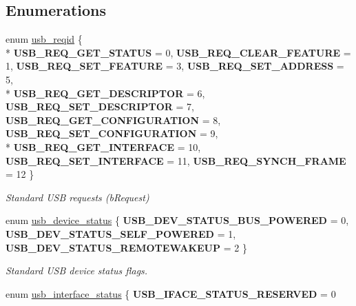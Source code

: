 \subsection*{Enumerations}
\begin{DoxyCompactItemize}
\item 
enum \hyperlink{group__usb__protocol__group_gab43332ff8dbad3dd3c8c882b1bd68a89}{usb\-\_\-reqid} \{ \\*
{\bfseries U\-S\-B\-\_\-\-R\-E\-Q\-\_\-\-G\-E\-T\-\_\-\-S\-T\-A\-T\-U\-S} =  0, 
{\bfseries U\-S\-B\-\_\-\-R\-E\-Q\-\_\-\-C\-L\-E\-A\-R\-\_\-\-F\-E\-A\-T\-U\-R\-E} =  1, 
{\bfseries U\-S\-B\-\_\-\-R\-E\-Q\-\_\-\-S\-E\-T\-\_\-\-F\-E\-A\-T\-U\-R\-E} =  3, 
{\bfseries U\-S\-B\-\_\-\-R\-E\-Q\-\_\-\-S\-E\-T\-\_\-\-A\-D\-D\-R\-E\-S\-S} =  5, 
\\*
{\bfseries U\-S\-B\-\_\-\-R\-E\-Q\-\_\-\-G\-E\-T\-\_\-\-D\-E\-S\-C\-R\-I\-P\-T\-O\-R} =  6, 
{\bfseries U\-S\-B\-\_\-\-R\-E\-Q\-\_\-\-S\-E\-T\-\_\-\-D\-E\-S\-C\-R\-I\-P\-T\-O\-R} =  7, 
{\bfseries U\-S\-B\-\_\-\-R\-E\-Q\-\_\-\-G\-E\-T\-\_\-\-C\-O\-N\-F\-I\-G\-U\-R\-A\-T\-I\-O\-N} =  8, 
{\bfseries U\-S\-B\-\_\-\-R\-E\-Q\-\_\-\-S\-E\-T\-\_\-\-C\-O\-N\-F\-I\-G\-U\-R\-A\-T\-I\-O\-N} =  9, 
\\*
{\bfseries U\-S\-B\-\_\-\-R\-E\-Q\-\_\-\-G\-E\-T\-\_\-\-I\-N\-T\-E\-R\-F\-A\-C\-E} =  10, 
{\bfseries U\-S\-B\-\_\-\-R\-E\-Q\-\_\-\-S\-E\-T\-\_\-\-I\-N\-T\-E\-R\-F\-A\-C\-E} =  11, 
{\bfseries U\-S\-B\-\_\-\-R\-E\-Q\-\_\-\-S\-Y\-N\-C\-H\-\_\-\-F\-R\-A\-M\-E} =  12
 \}
\begin{DoxyCompactList}\small\item\em Standard U\-S\-B requests (b\-Request) \end{DoxyCompactList}\item 
enum \hyperlink{group__usb__protocol__group_ga5c6f61a70ef0fda1a1d6f9a34f2f0f1c}{usb\-\_\-device\-\_\-status} \{ {\bfseries U\-S\-B\-\_\-\-D\-E\-V\-\_\-\-S\-T\-A\-T\-U\-S\-\_\-\-B\-U\-S\-\_\-\-P\-O\-W\-E\-R\-E\-D} =  0, 
{\bfseries U\-S\-B\-\_\-\-D\-E\-V\-\_\-\-S\-T\-A\-T\-U\-S\-\_\-\-S\-E\-L\-F\-\_\-\-P\-O\-W\-E\-R\-E\-D} =  1, 
{\bfseries U\-S\-B\-\_\-\-D\-E\-V\-\_\-\-S\-T\-A\-T\-U\-S\-\_\-\-R\-E\-M\-O\-T\-E\-W\-A\-K\-E\-U\-P} =  2
 \}
\begin{DoxyCompactList}\small\item\em Standard U\-S\-B device status flags. \end{DoxyCompactList}\item 
enum \hyperlink{group__usb__protocol__group_ga61c6d9f1bcc6112f394333fac658d627}{usb\-\_\-interface\-\_\-status} \{ {\bfseries U\-S\-B\-\_\-\-I\-F\-A\-C\-E\-\_\-\-S\-T\-A\-T\-U\-S\-\_\-\-R\-E\-S\-E\-R\-V\-E\-D} =  0

\end{DoxyCompactItemize}
